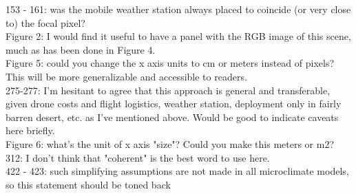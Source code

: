 \documentclass[12pt,english]{reviewresponse}
\begin{document}
\begin{revcomment}
153 - 161: was the mobile weather station always placed to coincide (or very close to) the focal pixel?\\
Figure 2: I would find it useful to have a panel with the RGB image of this scene, much as has been done in Figure 4.\\
Figure 5: could you change the x axis units to cm or meters instead of pixels? This will be more generalizable and accessible to readers.\\
275-277: I'm hesitant to agree that this approach is general and transferable, given drone costs and flight logistics, weather station, deployment only in fairly barren desert, etc. as I've mentioned above. Would be good to indicate caveats here briefly.\\
Figure 6: what's the unit of x axis "size"? Could you make this meters or m2?\\
312: I don't think that "coherent" is the best word to use here.\\
422 - 423: such simplifying assumptions are not made in all microclimate models, so this statement should be toned back
\end{revcomment}
\end{document}
